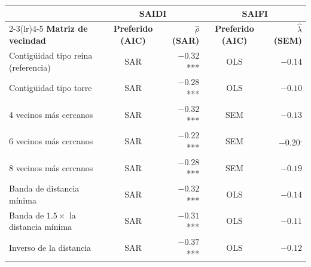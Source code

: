 \begin{tabular}{l c r c r}
\toprule
& \multicolumn{2}{c}{\textbf{SAIDI}} & \multicolumn{2}{c}{\textbf{SAIFI}} \\
\cmidrule(lr){2-3}\cmidrule(lr){4-5}
\textbf{Matriz de vecindad} & \textbf{Preferido (AIC)} & \textbf{$\hat\rho$ (SAR)} & \textbf{Preferido (AIC)} & \textbf{$\hat\lambda$ (SEM)} \\
\midrule
Contigüidad tipo reina (referencia) & SAR & $-0{.}32$*** & OLS & $-0{.}14$ \\
Contigüidad tipo torre & SAR & $-0{.}28$*** & OLS & $-0{.}10$ \\
4 vecinos más cercanos & SAR & $-0{.}32$*** & SEM & $-0{.}13$ \\
6 vecinos más cercanos & SAR & $-0{.}22$*** & SEM & $-0{.}20$\textsuperscript{.} \\
8 vecinos más cercanos & SAR & $-0{.}28$*** & SEM & $-0{.}19$ \\
Banda de distancia mínima & SAR & $-0{.}32$*** & OLS & $-0{.}14$ \\
Banda de $1{.}5\times$ la distancia mínima & SAR & $-0{.}31$*** & OLS & $-0{.}11$ \\
Inverso de la distancia & SAR & $-0{.}37$*** & OLS & $-0{.}12$ \\
\bottomrule
\end{tabular}
